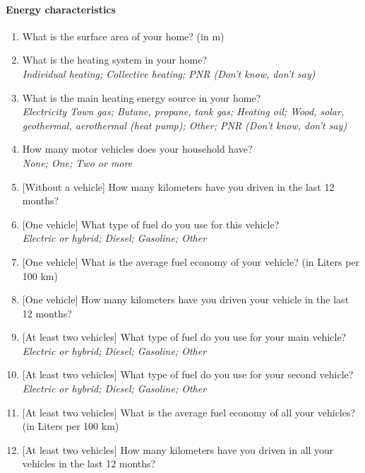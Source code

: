 \documentclass[12pt]{article} %
\begin{document}
\begin{appendices}
\paragraph{Energy characteristics}
\begin{enumerate}[resume,leftmargin=*]
\item What is the surface area of your home? (in m\texttwosuperior )
\item What is the heating system in your home? \emph{}\\
\emph{Individual heating; Collective heating; PNR (Don't know, don't
say)}
\item What is the main heating energy source in your home? \emph{}\\
\emph{Electricity Town gas; Butane, propane, tank gas; Heating oil;
Wood, solar, geothermal, aerothermal (heat pump); Other; PNR (Don't
know, don't say)}
\item How many motor vehicles does your household have? \emph{}\\
\emph{None; One; Two or more} 
\item {[}Without a vehicle{]} How many kilometers have you driven in the
last 12 months? 
\item {[}One vehicle{]} What type of fuel do you use for this vehicle? \emph{}\\
\emph{Electric or hybrid; Diesel; Gasoline; Other} 
\item {[}One vehicle{]} What is the average fuel economy of your vehicle?
(in Liters per 100 km)
\item {[}One vehicle{]} How many kilometers have you driven your vehicle
in the last 12 months?
\item {[}At least two vehicles{]} What type of fuel do you use for your
main vehicle?\\
\emph{Electric or hybrid; Diesel; Gasoline; Other} 
\item {[}At least two vehicles{]} What type of fuel do you use for your
second vehicle?\\
\emph{Electric or hybrid; Diesel; Gasoline; Other} 
\item {[}At least two vehicles{]} What is the average fuel economy of all
your vehicles? (in Liters per 100 km) 
\item {[}At least two vehicles{]} How many kilometers have you driven in
all your vehicles in the last 12 months? 
\end{enumerate}



\end{appendices}
\end{document}
